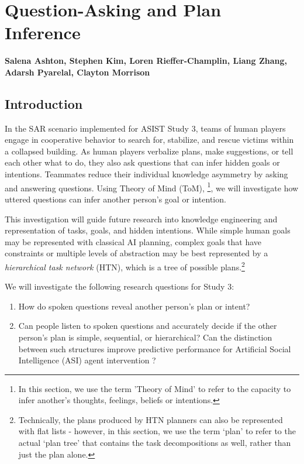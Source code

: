 \chapter{Question-Asking and Plan Inference}
\label{ch:question_plan}
\textbf{Salena Ashton, Stephen Kim, Loren Rieffer-Champlin, Liang Zhang,
Adarsh Pyarelal, Clayton Morrison}

\section{Introduction}

In the SAR scenario implemented for ASIST Study 3, teams of human
players engage in cooperative behavior to search for, stabilize, and rescue
victims within a collapsed building. As human players verbalize plans, make
suggestions, or tell each other what to do, they also ask questions that can
infer hidden goals or intentions. Teammates reduce their individual knowledge
asymmetry by asking and answering questions. Using Theory of Mind
(ToM),
\footnote{In this section, we use the term 'Theory of Mind' to refer to the
    capacity to infer another's thoughts, feelings, beliefs or
intentions.}, we will investigate how uttered questions can infer another
person's goal or intention. 

This investigation will guide future research into knowledge engineering and
representation of tasks, goals, and hidden intentions. While simple human goals
may be represented with classical AI planning, complex goals that have
constraints or multiple levels of abstraction may be best represented by a
\emph{hierarchical task network} (HTN), which is a tree of possible
plans.\footnote{Technically, the plans produced by HTN planners can also be
    represented with flat lists - however, in this section, we use the term
`plan' to refer to the actual `plan tree' that contains the task decompositions
as well, rather than just the plan alone.}

We will investigate the following research questions for Study 3:

\begin{enumerate}
    \item How do spoken questions reveal another person's plan or intent? 
    \item Can people listen to spoken questions and accurately decide if the
        other person's plan is simple, sequential, or hierarchical? Can the
        distinction between such structures improve predictive performance for
        Artificial Social Intelligence (ASI) agent intervention ?
\end{enumerate}


